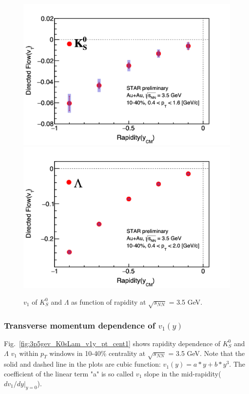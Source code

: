 \begin{figure}[hbt!]
\centering
\includegraphics[width=0.45\linewidth]{figures/chapter03/3p5gev_K0s_v1VSy.png}
\includegraphics[width=0.45\linewidth]{figures/chapter03/3p5gev_Lambda_v1VSy.png}
\caption{$v_1$ of $K^0_S$ and $\Lambda$ as function of rapidity at $\sqrt{s_{NN}}$ = 3.5 GeV.}
\label{fig:3p5gev_K0sLam_v1y}
\end{figure}

\subsubsection{Transverse momentum dependence of $v_1(y)$}

Fig.~\ref{fig:3p5gev_K0sLam_v1y_pt_cent1} shows rapidity dependence of $K^0_S$ and $\Lambda$ $v_1$ within $p_T$ windows in 10-40\% centrality at $\sqrt{s_{NN}}$ = 3.5 GeV.
Note that the solid and dashed line in the plots are cubic function: $v_1(y) = a*y + b*y^3$. 
The coefficient of the linear term "a" is so called $v_1$ slope in the mid-rapidity($dv_1/dy|_{y=0}$).

